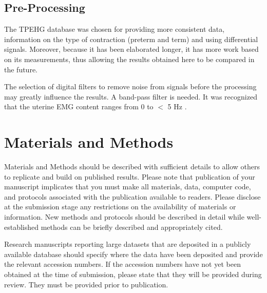 \documentclass[bioengineering,article,submit,moreauthors,pdftex,10pt,a4paper]{mdpi}
\begin{document}
 \subsection{Pre-Processing}
 
 The TPEHG database was chosen for providing more consistent data, information on the type of contraction (preterm and term) and using differential signals. Moreover, because it has been elaborated longer, it has more work based on its measurements, thus allowing the results obtained here to be compared in the future.
 
 The selection of digital filters to remove noise from signals
 before the processing may greatly influence the results.
 A band-pass filter is needed. It was recognized that the uterine
 EMG content ranges from 0 to $<$ 5 Hz \cite{ref-devedeux}.
 
 
 
 
 
 
 
 
 
 
 
 
 
 
 
 
 
 
 
 
 
 
 

\section{Materials and Methods}

Materials and Methods should be described with sufficient details to allow others to replicate and build on published results. Please note that publication of your manuscript implicates that you must make all materials, data, computer code, and protocols associated with the publication available to readers. Please disclose at the submission stage any restrictions on the availability of materials or information. New methods and protocols should be described in detail while well-established methods can be briefly described and appropriately cited.

Research manuscripts reporting large datasets that are deposited in a publicly available database should specify where the data have been deposited and provide the relevant accession numbers. If the accession numbers have not yet been obtained at the time of submission, please state that they will be provided during review. They must be provided prior to publication.
\end{document}
